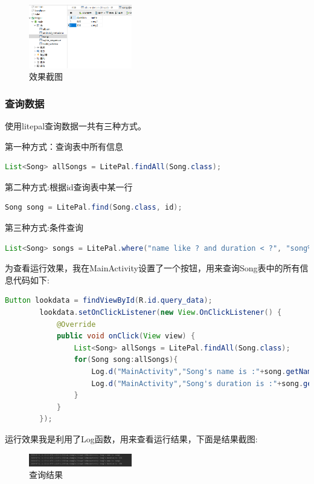 \documentclass[cs4size,a4paper]{ctexart}
\numberwithin{equation}{section}
\numberwithin{table}{section}
\numberwithin{figure}{section}
\begin{document}
\begin{figure}[H]
\small
\centering
\includegraphics[width=0.4\textwidth]{addresult}
\caption{效果截图} \label{效果截图}
\end{figure}

\subsubsection{查询数据}
使用litepal查询数据一共有三种方式。

第一种方式：查询表中所有信息
\begin{lstlisting}[language=java]
List<Song> allSongs = LitePal.findAll(Song.class);
\end{lstlisting}

第二种方式:根据id查询表中某一行
\begin{lstlisting}[language=java]
Song song = LitePal.find(Song.class, id);
\end{lstlisting}

第三种方式:条件查询
\begin{lstlisting}[language=java]
List<Song> songs = LitePal.where("name like ? and duration < ?", "song%", "200").order("duration").find(Song.class);
\end{lstlisting}

为查看运行效果，我在MainActivity设置了一个按钮，用来查询Song表中的所有信息代码如下:
\begin{lstlisting}[language=java]
        Button lookdata = findViewById(R.id.query_data);
        lookdata.setOnClickListener(new View.OnClickListener() {
            @Override
            public void onClick(View view) {
                List<Song> allSongs = LitePal.findAll(Song.class);
                for(Song song:allSongs){
                    Log.d("MainActivity","Song's name is :"+song.getName());
                    Log.d("MainActivity","Song's duration is :"+song.getDuration());
                }
            }
        });
\end{lstlisting}
运行效果我是利用了Log函数，用来查看运行结果，下面是结果截图:
\begin{figure}[H]
\small
\centering
\includegraphics[width=0.4\textwidth]{query}
\caption{查询结果} \label{查询结果}
\end{figure}
\end{document}
